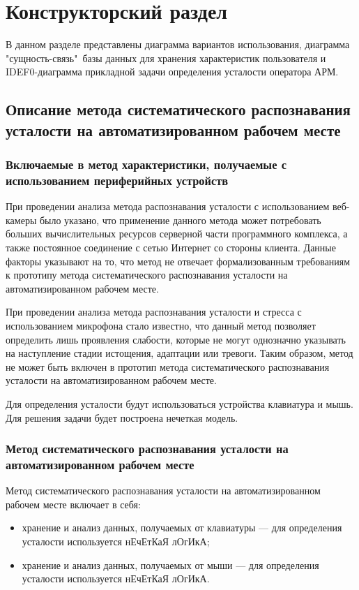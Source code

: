 \section{Конструкторский раздел}
В данном разделе представлены диаграмма вариантов использования, диаграмма "сущность-связь"\ базы данных для хранения характеристик пользователя и IDEF0-диаграмма прикладной задачи определения усталости оператора АРМ.

\subsection{Описание метода систематического распознавания усталости на автоматизированном рабочем месте}

\subsubsection{Включаемые в метод характеристики, получаемые с использованием периферийных устройств}

При проведении анализа метода распознавания усталости с использованием веб-камеры было указано, что применение данного метода может потребовать больших вычислительных ресурсов серверной части программного комплекса, а также постоянное соединение с сетью Интернет со стороны клиента. Данные факторы указывают на то, что метод не отвечает формализованным требованиям к прототипу метода систематического распознавания усталости на автоматизированном рабочем месте.

При проведении анализа метода распознавания усталости и стресса с использованием микрофона стало известно, что данный метод позволяет определить лишь проявления слабости, которые не могут однозначно указывать на наступление стадии истощения, адаптации или тревоги. Таким образом, метод не может быть включен в прототип метода систематического распознавания усталости на автоматизированном рабочем месте.

Для определения усталости будут использоваться устройства клавиатура и мышь. Для решения задачи будет построена нечеткая модель.

\subsubsection{Метод систематического распознавания усталости на автоматизированном рабочем месте}
Метод систематического распознавания усталости на автоматизированном рабочем месте включает в себя:
\begin{itemize}[leftmargin=1.6\parindent]
\item хранение и анализ данных, получаемых от клавиатуры --- для определения усталости используется нЕчЕтКаЯ лОгИкА;
\item хранение и анализ данных, получаемых от мыши --- для определения усталости используется нЕчЕтКаЯ лОгИкА.
\end{itemize}

